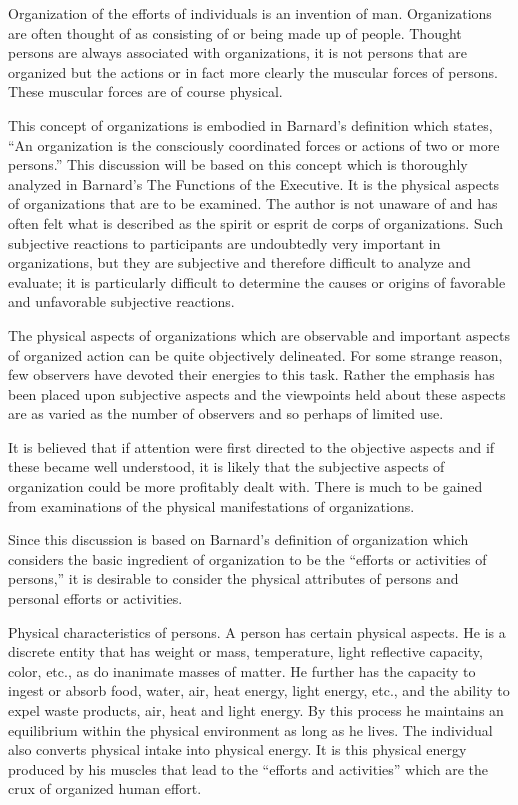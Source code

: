 Organization of the efforts of individuals is an invention of man. Organizations are often thought of as consisting of or being made up of people. Thought persons are always associated with organizations, it is not persons that are organized but the actions or in fact more clearly the muscular forces of persons. These muscular forces are of course physical.

This concept of organizations is embodied in Barnard’s definition which states, “An organization is the consciously coordinated forces or actions of two or more persons.”  This discussion will be based on this concept which is thoroughly analyzed in Barnard’s The Functions of the Executive. It is the physical aspects of organizations that are to be examined. The author is not unaware of and has often felt what is described as the spirit or esprit de corps of organizations. Such subjective reactions to participants are undoubtedly very important in organizations, but they are subjective and therefore difficult to analyze and evaluate; it is particularly difficult to determine the causes or origins of favorable and unfavorable subjective reactions.

The physical aspects of organizations which are observable and important aspects of organized action can be quite objectively delineated. For some strange reason, few observers have devoted their energies to this task. Rather the emphasis has been placed upon subjective aspects and the viewpoints held about these aspects are as varied as the number of observers and so perhaps of limited use.

It is believed that if attention were first directed to the objective aspects and if these became well understood, it is likely that the subjective aspects of organization could be more profitably dealt with.
There is much to be gained from examinations of the physical manifestations of organizations.

Since this discussion is based on Barnard’s definition of organization which considers the basic ingredient of organization to be the ``efforts or activities of persons,'' it is desirable to consider the physical attributes of persons and personal efforts or activities.

Physical characteristics of persons. A person has certain physical aspects. He is a discrete entity that has weight or mass, temperature, light reflective capacity, color, etc., as do inanimate masses of matter. He further has the capacity to ingest or absorb food, water, air, heat energy, light energy, etc., and the ability to expel waste products, air, heat and light energy. By this process he maintains an equilibrium within the physical environment as long as he lives. The individual also converts physical intake into physical energy. It is this physical energy produced by his muscles that lead to the ``efforts and activities'' which are the crux of organized human effort.

